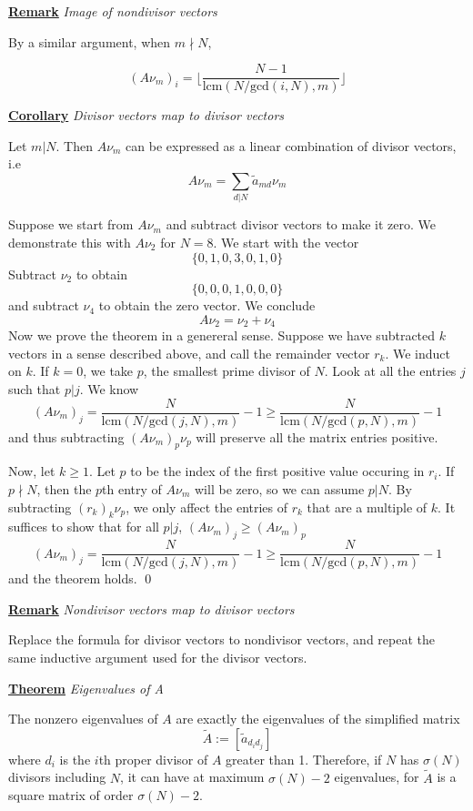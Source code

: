 \documentclass{article}
\newcommand{\new}[2]{
    \vspace{2mm}
    \noindent
    \textbf{
    \underline{#1}}
    \textit{
        {#2}
    }
    \vspace{2mm}
    \newline
}
\begin{document}
\new{Remark} {Image of nondivisor vectors}
By a similar argument, when $m \nmid N$, 

\[
    (A \nu_m)_i = \bigg\lfloor\frac {N - 1} 
    {\text{lcm}(N/\text{gcd}(i, N), m)}\bigg \rfloor
\]



\new{Corollary} {Divisor vectors map to divisor vectors}
Let $m|N$. Then $ A \nu_m$ can be expressed as a linear 
combination of divisor vectors, i.e
\[
     A \nu_m = \sum_{d|N} \tilde a_{md} \nu_m
\]

\proof 
Suppose we start from $A\nu_m$ and subtract divisor vectors 
to make it zero. We demonstrate this with $A\nu_2$ for 
$N = 8$. We start with the vector 
\[
    \{0,1,0,3,0,1,0\}
\]
Subtract $\nu_2$ to obtain 
\[
\{0,0,0,1,0,0,0\}
\]
and subtract $\nu_4$ to obtain the zero vector. We conclude 
\[
A\nu_2 = \nu_2 + \nu_4
\]
Now we prove the theorem in a genereral sense. 
Suppose we have subtracted $k$ vectors in a sense described above, 
and call the remainder vector $r_k$. 
We induct on $k$. If $k = 0$, we take $p$, the smallest prime divisor 
of $N$. Look at all the entries $j$ such that $p|j$. We know 
\[
     (A \nu_m)_j = \frac N 
    {\text{lcm}(N/\text{gcd}(j, N), m)} - 1 \geq \frac N 
    {\text{lcm}(N/\text{gcd}(p, N), m)} - 1
\]
and thus subtracting $(A\nu_m)_p \nu_p$ will preserve 
all the matrix entries positive. 

Now, let $k \geq 1$. Let $p$ to be the index of the first 
positive value occuring in $r_i$. If $p \nmid N$, then the 
$p$th entry of $A\nu_m$ will be zero, so we can assume $p | N$.
By subtracting $(r_k)_k\nu_p$, we only affect the entries of $r_k$ 
that are a multiple of $k$. It suffices to show that for all $p|j$, 
$     (A \nu_m)_j \geq      (A \nu_m)_p$
\[
     (A \nu_m)_j = \frac N 
    {\text{lcm}(N/\text{gcd}(j, N), m)} - 1 \geq \frac N 
    {\text{lcm}(N/\text{gcd}(p, N), m)} - 1
\]
and the theorem holds. \hfill \qed

\new {Remark} {Nondivisor vectors map to divisor vectors} 
Replace the formula for divisor vectors to nondivisor vectors, 
and repeat the same inductive argument used for the divisor vectors. 

\new {Theorem} {Eigenvalues of A}
The nonzero eigenvalues of $A$ are exactly the eigenvalues of 
the simplified matrix 
\[
    \tilde A := [\tilde a_{d_i d_j}]
\] 
where $d_i$ is the $i$th proper divisor of $A$ greater than 1. Therefore, if $N$ has 
$\sigma(N)$ divisors including $N$, it can have at maximum $\sigma(N) - 2$ eigenvalues, 
for $\tilde A$ is a square matrix of order $\sigma(N) - 2$. 
\end{document}
